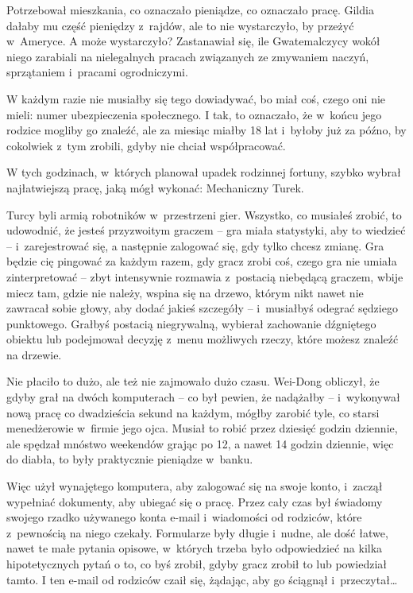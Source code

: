 \documentclass[oneside,polish,11pt,rmheadings]{mwbk}
\begin{document}
Potrzebował mieszkania, co oznaczało pieniądze, co oznaczało pracę. Gildia dałaby mu część pieniędzy z~rajdów, ale to nie wystarczyło, by przeżyć w~Ameryce. A może wystarczyło? Zastanawiał się, ile Gwatemalczycy wokół niego zarabiali na nielegalnych pracach związanych ze zmywaniem naczyń, sprzątaniem i~pracami ogrodniczymi. 


W każdym razie nie musiałby się tego dowiadywać, bo miał coś, czego oni nie mieli: numer ubezpieczenia społecznego. I tak, to oznaczało, że w~końcu jego rodzice mogliby go znaleźć, ale za miesiąc miałby 18 lat i~byłoby już za późno, by cokolwiek z~tym zrobili, gdyby nie chciał współpracować. 


W tych godzinach, w~których planował upadek rodzinnej fortuny, szybko wybrał najłatwiejszą pracę, jaką mógł wykonać: Mechaniczny Turek. 


Turcy byli armią robotników w~przestrzeni gier. Wszystko, co musiałeś zrobić, to udowodnić, że jesteś przyzwoitym graczem -- gra miała statystyki, aby to wiedzieć -- i~zarejestrować się, a następnie zalogować się, gdy tylko chcesz zmianę. Gra będzie cię pingować za każdym razem, gdy gracz zrobi coś, czego gra nie umiała zinterpretować -- zbyt intensywnie rozmawia z~postacią niebędącą graczem, wbije miecz tam, gdzie nie należy, wspina się na drzewo, którym nikt nawet nie zawracał sobie głowy, aby dodać jakieś szczegóły -- i~musiałbyś odegrać sędziego punktowego. Grałbyś postacią niegrywalną, wybierał zachowanie dźgniętego obiektu lub podejmował decyzję z~menu możliwych rzeczy, które możesz znaleźć na drzewie. 


Nie płaciło to dużo, ale też nie zajmowało dużo czasu. Wei-Dong obliczył, że gdyby grał na dwóch komputerach -- co był pewien, że nadążałby -- i~wykonywał nową pracę co dwadzieścia sekund na każdym, mógłby zarobić tyle, co starsi menedżerowie w~firmie jego ojca. Musiał to robić przez dziesięć godzin dziennie, ale spędzał mnóstwo weekendów grając po 12, a nawet 14 godzin dziennie, więc do diabła, to były praktycznie pieniądze w~banku. 


Więc użył wynajętego komputera, aby zalogować się na swoje konto, i~zaczął wypełniać dokumenty, aby ubiegać się o pracę. Przez cały czas był świadomy swojego rzadko używanego konta e-mail i~wiadomości od rodziców, które z~pewnością na niego czekały. Formularze były długie i~nudne, ale dość łatwe, nawet te małe pytania opisowe, w~których trzeba było odpowiedzieć na kilka hipotetycznych pytań o to, co byś zrobił, gdyby gracz zrobił to lub powiedział tamto. I ten e-mail od rodziców czaił się, żądając, aby go ściągnął i~przeczytał\ldots  
\end{document}
